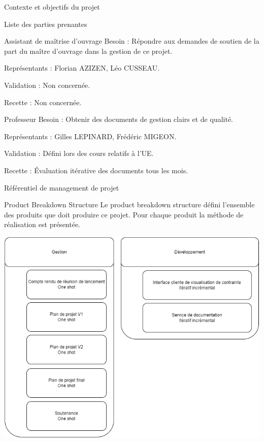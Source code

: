 \documentclass[]{article}
\begin{document}
{\begin{section}{\label{sec:Contexte et objectifs du projet}Contexte et objectifs du projet}
\begin{subsection}{\label{sec:Liste des parties prenantes}Liste des parties prenantes}
         \begin{subsubsection}{\label{sec:Assistant de maîtrise d’ouvrage}Assistant de maîtrise d’ouvrage}
             Besoin : Répondre aux demandes de soutien de la part du maître d'ouvrage dans la gestion de ce projet.

             Représentants : Florian AZIZEN,  Léo CUSSEAU.

             Validation : Non concernée.

             Recette : Non concernée.
         \end{subsubsection}

         \begin{subsubsection}{\label{sec:Professeur}Professeur}
             Besoin : Obtenir des documents de gestion clairs et de qualité.

             Représentants : Gilles LEPINARD, Frédéric MIGEON.

             Validation : Défini lors des cours relatifs à l’UE.

             Recette : Évaluation itérative des documents tous les mois.
         \end{subsubsection}
     \end{subsection}
    \end{section}

    \newpage

    \begin{section}{\label{sec:Référentiel de management de projet}Référentiel de management de projet}
     \begin{subsection}{\label{sec:Product Breakdown Structure}Product Breakdown Structure}
         Le product breakdown structure défini l’ensemble des produits que doit produire ce projet. Pour chaque produit la méthode de réalisation est présentée.

         \includegraphics[scale=0.4]{documents/IMG/PBS}
     \end{subsection} 


\end{section}}
\end{document}
